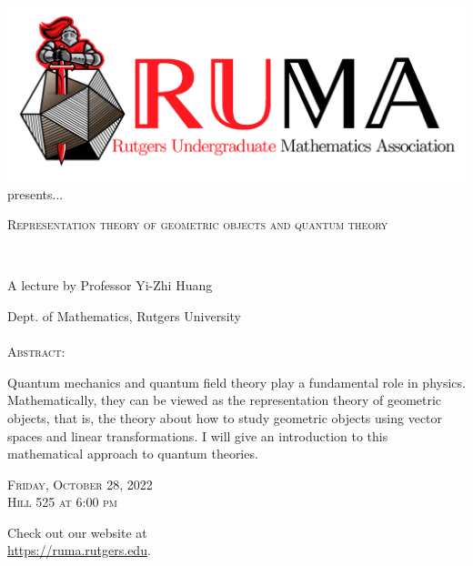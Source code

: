 \documentclass[12pt]{article}
\begin{document}

\begin{center}\includegraphics[scale=.3]{RUMAlogo.png}\\
\large  presents... \\

\vspace{2mm}
\begin{spacing}{2}
{\fontsize{32}{28}\selectfont  \textsc{
    Representation theory of geometric objects and quantum theory
    }} \end{spacing}
 
~~\\
\begin{spacing}{1}
{\fontsize{24}{24} \selectfont A lecture by Professor Yi-Zhi Huang}  \end{spacing} 
\large Dept. of Mathematics, Rutgers University \\~~\\

\normalsize
\textsc{Abstract:}

\Large 
Quantum mechanics and quantum field theory play a fundamental role in physics. Mathematically, they can be viewed as the representation theory of geometric objects, that is, the theory about how to study geometric objects using vector spaces and linear transformations. I will give an introduction to this mathematical approach to quantum theories.


\begin{spacing}{2}
    {\fontsize{30}{28}\selectfont  \textsc{
        Friday, October 28, 2022 \\Hill 525 at 6:00 pm
    }} 
\end{spacing}

\Large  Check out our website at \\
\url{https://ruma.rutgers.edu}.
\end{center}
\end{document}
